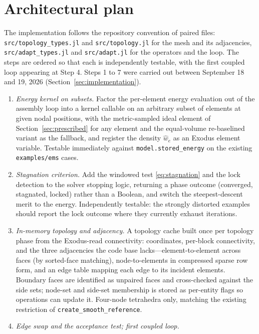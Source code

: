 \documentclass[11pt]{article}
\newcommand{\code}[1]{\texttt{#1}}
\begin{document}
\section{Architectural plan}
\label{sec:architecture}

The implementation follows the repository convention of paired files:
\code{src/topology\_types.jl} and \code{src/topology.jl} for the mesh
and its adjacencies, \code{src/adapt\_types.jl} and \code{src/adapt.jl}
for the operators and the loop. The steps are ordered so that each is
independently testable, with the first coupled loop appearing at Step 4.
Steps 1 to 7 were carried out between September 18 and 19, 2026
(Section~\ref{sec:implementation}).

\begin{enumerate}[itemsep=3pt]
\item \emph{Energy kernel on subsets.} Factor the per-element energy
  evaluation out of the assembly loop into a kernel callable on an
  arbitrary subset of elements at given nodal positions, with the
  metric-sampled ideal element of Section~\ref{sec:prescribed} for any
  element and the equal-volume re-baselined variant as the fallback,
  and register the density $\hat{w}_e$ as an Exodus element variable. Testable immediately
  against \code{model.stored\_energy} on the existing \code{examples/ems}
  cases.
\item \emph{Stagnation criterion.} Add the windowed test
  \eqref{eq:stagnation} and the lock detection to the solver stopping
  logic, returning a phase outcome (converged, stagnated, locked)
  rather than a Boolean, and switch the steepest-descent merit to the
  energy. Independently testable: the strongly distorted examples
  should report the lock outcome where they currently exhaust
  iterations.
\item \emph{In-memory topology and adjacency.} A topology cache built
  once per topology phase from the Exodus-read connectivity:
  coordinates, per-block connectivity, and the three adjacencies the
  code base lacks---element-to-element across faces (by sorted-face
  matching), node-to-elements in compressed sparse row form, and an
  edge table mapping each edge to its incident elements. Boundary faces
  are identified as unpaired faces and cross-checked against the side
  sets; node-set and side-set membership is stored as per-entity flags
  so operations can update it. Four-node tetrahedra only, matching the
  existing restriction of \code{create\_smooth\_reference}.
\item \emph{Edge swap and the acceptance test; first coupled loop.}

\end{enumerate}
\end{document}
